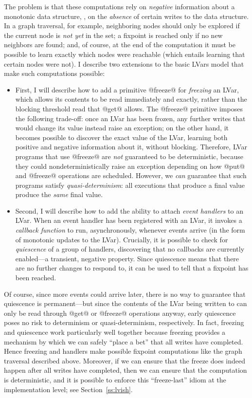 The problem is that these computations rely on \emph{negative}
information about a monotonic data structure, \ie, on the
\emph{absence} of certain writes to the data structure.  In a graph
traversal, for example, neighboring nodes should only be explored if
the current node is \emph{not yet} in the set; a fixpoint is reached
only if no new neighbors are found; and, of course, at the end of the
computation it must be possible to learn exactly which nodes were
reachable (which entails learning that certain nodes were not).  I
describe two extensions to the basic LVars model that make such
computations possible:
\begin{itemize}
\item First, I will describe how to add a primitive @freeze@ for
  \emph{freezing} an LVar, which allows its contents to be read
  immediately and exactly, rather than the blocking threshold read
  that @get@ allows.  The @freeze@ primitive imposes the following
  trade-off: once an LVar has been frozen, any further writes that
  would change its value instead raise an exception; on the other
  hand, it becomes possible to discover the exact value of the LVar,
  learning both positive and negative information about it, without
  blocking.  Therefore, LVar programs that use @freeze@ are \emph{not}
  guaranteed to be deterministic, because they could
  nondeterministically raise an exception depending on how @put@ and
  @freeze@ operations are scheduled.  However, we \emph{can} guarantee
  that such programs satisfy \emph{quasi-determinism}: all executions
  that produce a final value produce the \emph{same} final value.
\item Second, I will describe how to add the ability to attach
  \emph{event handlers} to an LVar.  When an event handler has been
  registered with an LVar, it invokes a \emph{callback function} to
  run, asynchronously, whenever events arrive (in the form of
  monotonic updates to the LVar).  Crucially, it is possible to check
  for \emph{quiescence} of a group of handlers, discovering that no
  callbacks are currently enabled---a transient, negative property.
  Since quiescence means that there are no further changes to respond
  to, it can be used to tell that a fixpoint has been reached.
\end{itemize}
Of course, since more events could arrive later, there is no way to
guarantee that quiescence is permanent---but since the contents of the
LVar being written to can only be read through @get@ or @freeze@
operations anyway, early quiescence poses no risk to determinism or
quasi-determinism, respectively.  In fact, freezing and quiescence
work particularly well together because freezing provides a mechanism
by which we can safely ``place a bet'' that all writes have completed.
Hence freezing and handlers make possible fixpoint computations like
the graph traversal described above.  Moreover, if we can ensure that
the freeze does indeed happen after all writes have completed, then we
can ensure that the computation is deterministic, and it is possible
to enforce this ``freeze-last'' idiom at the implementation level; see
Section~\ref{ss:lvish}.

